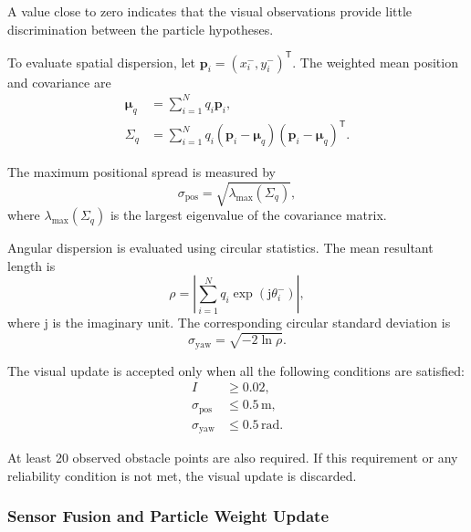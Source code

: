 \documentclass[a4paper,11pt,oneside]{book}
\begin{document}
A value close to zero indicates that the visual observations
provide little discrimination between the particle hypotheses.

To evaluate spatial dispersion, let
$\mathbf{p}_i=(x_i^{-},y_i^{-})^{\mathsf{T}}$.
The weighted mean position and covariance are
\begin{align}
    \boldsymbol{\mu}_q
    &=
    \sum_{i=1}^{N}q_i\mathbf{p}_i, \\
    \Sigma_q
    &=
    \sum_{i=1}^{N}
    q_i
    \left(\mathbf{p}_i-\boldsymbol{\mu}_q\right)
    \left(\mathbf{p}_i-\boldsymbol{\mu}_q\right)^{\mathsf{T}}.
\end{align}

The maximum positional spread is measured by
\begin{equation}
    \sigma_{\mathrm{pos}}
    =
    \sqrt{\lambda_{\max}(\Sigma_q)},
    \label{eq:visual_position_spread}
\end{equation}
where $\lambda_{\max}(\Sigma_q)$ is the largest eigenvalue
of the covariance matrix.

Angular dispersion is evaluated using circular statistics.
The mean resultant length is
\begin{equation}
    \rho
    =
    \left|
        \sum_{i=1}^{N}q_i
        \exp\left(\mathrm{j}\theta_i^{-}\right)
    \right|,
\end{equation}
where $\mathrm{j}$ is the imaginary unit. The corresponding
circular standard deviation is
\begin{equation}
    \sigma_{\mathrm{yaw}}
    =
    \sqrt{-2\ln\rho}.
    \label{eq:visual_yaw_spread}
\end{equation}

The visual update is accepted only when all the following
conditions are satisfied:
\begin{equation}
    \begin{aligned}
        I &\geq 0.02, \\
        \sigma_{\mathrm{pos}} &\leq 0.5\,\mathrm{m}, \\
        \sigma_{\mathrm{yaw}} &\leq 0.5\,\mathrm{rad}.
    \end{aligned}
    \label{eq:visual_reliability_conditions}
\end{equation}

At least 20 observed obstacle points are also required.
If this requirement or any reliability condition is not met,
the visual update is discarded.

\subsubsection{Sensor Fusion and Particle Weight Update}
\end{document}
